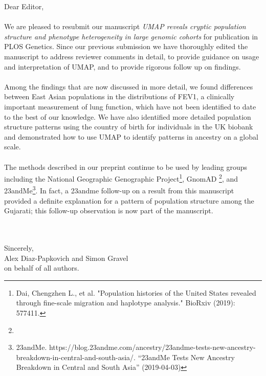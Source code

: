 \documentclass{article}
\begin{document}
Dear Editor,
\\\\
We are pleased to resubmit our manuscript \emph{UMAP reveals cryptic population structure and phenotype heterogeneity in large genomic cohorts} for publication in PLOS Genetics. Since our previous submission we have thoroughly edited the manuscript to address reviewer comments in detail, to provide guidance on usage and interpretation of UMAP, and to provide rigorous follow up on findings.
\\\\
Among the findings that are now discussed in more detail, we found differences between East Asian populations in the distributions of FEV1, a clinically important measurement of lung function, which have not been identified to date to the best of our knowledge. We have also identified more detailed population structure patterns using the country of birth for individuals in the UK biobank and demonstrated how to use UMAP to identify patterns in ancestry on a global scale.
\\\\
The methods described in our preprint continue to be used by leading groups including the National Geographic Genographic Project\footnote{Dai, Chengzhen L., et al. "Population histories of the United States revealed through fine-scale migration and haplotype analysis." BioRxiv (2019): 577411.}, GnomAD \footnote{}, and 23andMe\footnote{23andMe. https://blog.23andme.com/ancestry/23andme-tests-new-ancestry-breakdown-in-central-and-south-asia/. ``23andMe Tests New Ancestry Breakdown in Central and South Asia'' (2019-04-03)}. In fact, a 23andme follow-up on a result from this manuscript provided a definite explanation for a pattern of population structure among the Gujarati; this follow-up observation is now part of the manuscript.  

\\
\\
Sincerely,
\\
Alex Diaz-Papkovich and Simon Gravel
\\
on behalf of all authors.
\end{document}
